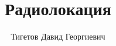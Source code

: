 \documentclass[a4paper,12pt]{article}
\begin{document}
\title{Радиолокация}
\author{Тигетов Давид Георгиевич}
\maketitle



\end{document}
